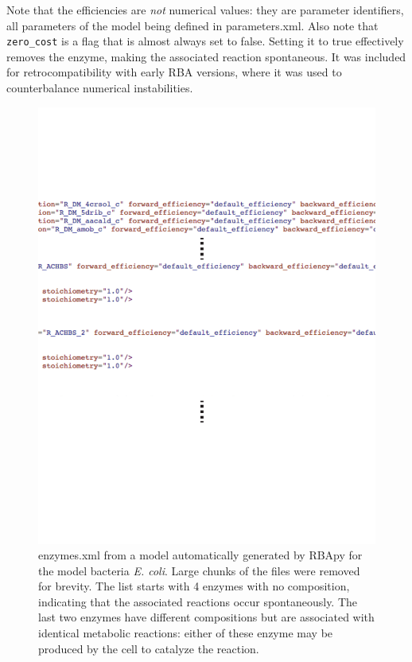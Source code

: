 Note that the efficiencies are \emph{not} numerical values:
they are parameter identifiers, all parameters of the model being defined in parameters.xml.
Also note that \texttt{zero\_cost} is a flag that is almost always set to false.
Setting it to true effectively removes the enzyme, making the associated reaction
spontaneous.
It was included for retrocompatibility with early RBA versions, where it was
used to counterbalance numerical instabilities.



\begin{figure}
  \centering
  \includegraphics[scale=0.6]{figures/enzymes_ex_1}
  \caption{enzymes.xml from a model automatically generated by RBApy for the
  model bacteria \textit{E. coli}.
  Large chunks of the files were removed for brevity.
  The list starts with 4 enzymes with no composition, indicating that
  the associated reactions occur spontaneously.
  The last two enzymes have different compositions but are associated with
  identical metabolic reactions:
  either of these enzyme may be produced by the cell to catalyze the reaction.}
  \label{fig:enzymes_ex_1}
\end{figure}

